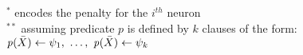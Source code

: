 \begin{table}
\begin{tabular}{l|r||cl|r}
    \end{tabular}
    \begin{center}\scriptsize
        $^{*}$ encodes the penalty for the $i^{th}$ neuron
        \\
        \smallskip
        $^{**}$ assuming predicate $p$ is defined by $k$ clauses of the form:
        \\
        $\pred{p}(\bar{X}) \leftarrow \psi_1,\ \ldots,\ \pred{p}(\bar{X}) \leftarrow \psi_k$
    \end{center}
\end{table}